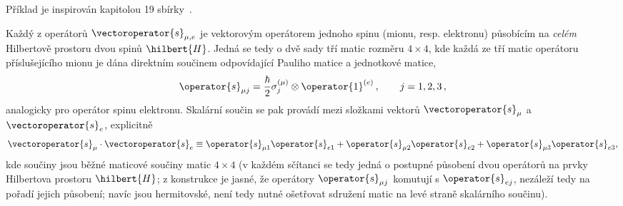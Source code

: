 \begin{note}
	Příklad je inspirován kapitolou 19 sbírky~\cite{Basdevant2000}.
\end{note}

\begin{note}
	Každý z operátorů $\vectoroperator{s}_{\mu,e}$ je vektorovým operátorem jednoho spinu (mionu, resp. elektronu) působícím na \emph{celém} Hilbertově prostoru dvou spinů $\hilbert{H}$.
	Jedná se tedy o dvě sady tří matic rozměru $4\times4$, kde každá ze tří matic operátoru příslušejícího mionu je dána direktním součinem odpovídající Pauliho matice a jednotkové matice,
	\begin{equation}
		\operator{s}_{\mu j}
			=\frac{\hbar}{2}\sigma_{j}^{(\mu)}\otimes\operator{1}^{(e)}\,,\qquad j=1,2,3\,,
	\end{equation}
	analogicky pro operátor spinu elektronu.
	Skalární součin se pak provádí mezi složkami vektorů $\vectoroperator{s}_{\mu}$ a $\vectoroperator{s}_{e}$, explicitně
	\begin{equation}
		\vectoroperator{s}_{\mu}\cdot\vectoroperator{s}_{e}
			\equiv\operator{s}_{\mu1}\operator{s}_{e1}+\operator{s}_{\mu2}\operator{s}_{e2}+\operator{s}_{\mu3}\operator{s}_{e3},
	\end{equation}
	kde součiny jsou běžné maticové součiny matic $4\times4$ (v každém sčítanci se tedy jedná o postupné působení dvou operátorů na prvky Hilbertova prostoru $\hilbert{H}$; z konstrukce je jasné, že operátory $\operator{s}_{\mu j}$ komutují s $\operator{s}_{ej}$, nezáleží tedy na pořadí	jejich působení; navíc jsou hermitovské, není tedy nutné ošetřovat sdružení matic na levé straně skalárního součinu).
\end{note}
	
